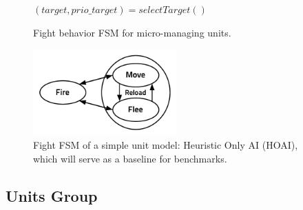 \begin{figure}[h]
\begin{algorithmic}
\Else
\EndIf
\EndFunction

\State $(target, prio\_target) = selectTarget()$
    \Else
    \EndIf
\Else
\EndIf
\EndFunction
\end{algorithmic}
\caption{Fight behavior FSM for micro-managing units.}
\label{alg:fight_FSM}
\end{figure}

\begin{figure}[h]
\begin{center}
\includegraphics[width=5.5cm]{images/simple_unit_fight_FSM.pdf}
\end{center}
\caption{Fight FSM of a simple unit model: Heuristic Only AI (HOAI), which will serve as a baseline for benchmarks.}
\label{fig:fight_FSM}
\end{figure}


\subsection{Units Group}

